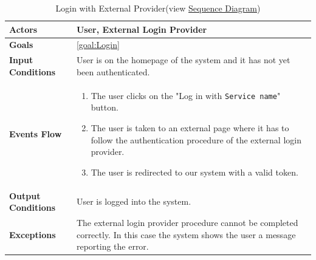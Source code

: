 \begin{table}[H]
	\centering
	\def\arraystretch{1.5}
	\begin{tabular}{|m{7cm}|m{7cm}|}
		\hline
		\textbf{Actors}            & User, External Login Provider		    \\ \hline
		\textbf{Goals}             & \ref{goal:Login}           \\ \hline
		\textbf{Input Conditions}  & User is on the homepage of the system and it has not yet been authenticated.           \\ \hline
		\textbf{Events Flow}       &    
		\begin{enumerate}
			\item The user clicks on the "Log in with \texttt{Service name}" button.
			\item The user is taken to an external page where it has to follow the authentication procedure of the external login provider.
			\item The user is redirected to our system with a valid token.
		\end{enumerate} \\ \hline
		\textbf{Output Conditions} & User is logged into the system.          \\ \hline
		\textbf{Exceptions}        & The external login provider procedure cannot be completed correctly. In this case the system shows the user a message reporting the error.         \\ \hline
	\end{tabular}
	\caption[Login with External Provider]{{Login with External Provider}\label{UseCaseDescr:LoginExternal} (view \hyperref[SeqDiagr:LoginExternal]{Sequence Diagram})}
\end{table}

